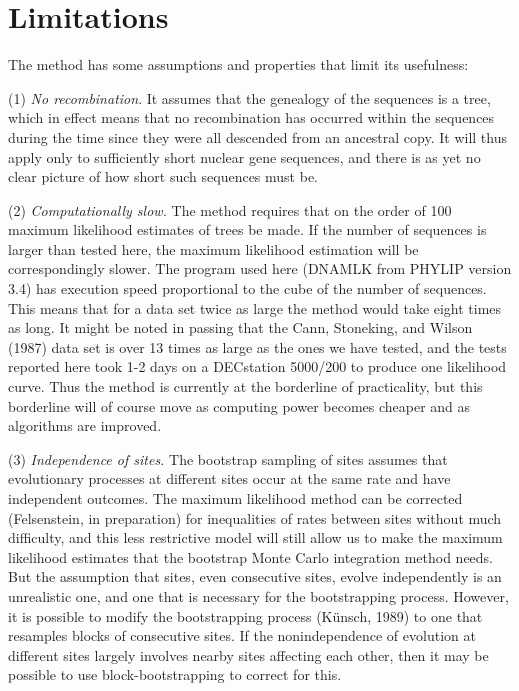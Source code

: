 \section{Limitations}

The method has some assumptions and properties that limit its usefulness:

(1) {\it No recombination}. It assumes that the genealogy of the sequences is a tree, which in
effect means that no recombination has occurred within the sequences during
the time since they were all descended from an ancestral copy.  It
will thus apply only to sufficiently short nuclear gene sequences, and
there is as yet no clear picture of how short such sequences must be.

(2) {\it Computationally slow.}  The method requires that on the order of 100
maximum likelihood estimates of trees be made.  If the number of sequences
is larger than tested here, the maximum likelihood estimation will be
correspondingly slower.  The program used here (DNAMLK from PHYLIP version
3.4) has execution speed proportional to the cube of the number of sequences.
This means that for a data set twice as large the method would take eight
times as long.  It might be noted in passing that the Cann, Stoneking, and
Wilson (1987) data set is over 13 times as large as the ones we have tested,
and the tests reported here took 1-2 days on a DECstation 5000/200 to produce
one likelihood
curve.  Thus the method is currently at the borderline of practicality, but
this borderline will of course move as computing power becomes cheaper and as
algorithms are improved.

(3) {\it Independence of sites.}  The bootstrap sampling of sites assumes that
evolutionary processes at different sites occur at the same rate and have
independent outcomes.  The maximum likelihood method can be corrected
(Felsenstein, in preparation) for inequalities of rates between sites
without much difficulty, and this less restrictive model will still allow
us to make the maximum likelihood estimates that the bootstrap Monte
Carlo integration method needs.  But the assumption that sites, even
consecutive sites, evolve independently is an unrealistic one, and one
that is necessary for the bootstrapping process.  However, it is possible to
modify the bootstrapping process (K\"{u}nsch, 1989) to one that resamples
blocks of consecutive sites.  If the nonindependence of evolution at
different sites largely involves nearby sites affecting each other, then it
may be possible to use block-bootstrapping to correct for this.
\bigskip

